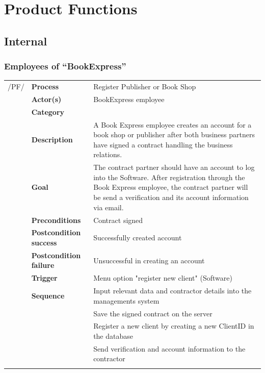 \documentclass[11pt,a4paper,oneside,svgnames]{report}
\begin{document}
\chapter{Product Functions}

\section{Internal}
\subsection{Employees of ``BookExpress''}

\noindent
\begin{tabular}{p{1.5cm}p{3cm}p{8cm}}
/PF/	& \textbf{Process}	& Register Publisher or Book Shop\\
		& \textbf{Actor(s)} & BookExpress employee\\
		& \textbf{Category} & \\
		& \textbf{Description}	 & A Book Express employee creates an account for a book shop or publisher after both business partners have signed a contract handling the business relations.\\
		& \textbf{Goal} & The contract partner should have an account to log into the Software. After registration through the Book Express employee, the contract partner will be send a verification and its account information via email.\\
		& \textbf{Preconditions} & Contract signed\\
		& \textbf{Postcondition success} & Successfully created account\\
		& \textbf{Postcondition failure} & Unsuccessful in creating an account\\
		& \textbf{Trigger} & Menu option "register new client" (Software)\\
		& \textbf{Sequence} & Input relevant data and contractor details into the managements system\\
		& & Save the signed contract on the server\\
		& & Register a new client by creating a new ClientID in the database\\
		& & Send verification and account information to the contractor\\
\hfill \\
\end{tabular}
\end{document}
